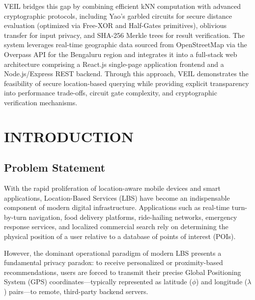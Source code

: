 \documentclass[12pt,a4paper,oneside]{report}
\begin{document}
VEIL bridges this gap by combining efficient kNN computation with advanced cryptographic protocols, including Yao's garbled circuits for secure distance evaluation (optimized via Free-XOR and Half-Gates primitives), oblivious transfer for input privacy, and SHA-256 Merkle trees for result verification. The system leverages real-time geographic data sourced from OpenStreetMap via the Overpass API for the Bengaluru region and integrates it into a full-stack web architecture comprising a React.js single-page application frontend and a Node.js/Express REST backend. Through this approach, VEIL demonstrates the feasibility of secure location-based querying while providing explicit transparency into performance trade-offs, circuit gate complexity, and cryptographic verification mechanisms.

\newpage
\tableofcontents
\newpage
\listoffigures
\newpage
\listoftables

\newpage
{}

\chapter{INTRODUCTION}

\section{Problem Statement}
With the rapid proliferation of location-aware mobile devices and smart applications, Location-Based Services (LBS) have become an indispensable component of modern digital infrastructure. Applications such as real-time turn-by-turn navigation, food delivery platforms, ride-hailing networks, emergency response services, and localized commercial search rely on determining the physical position of a user relative to a database of points of interest (POIs).

However, the dominant operational paradigm of modern LBS presents a fundamental privacy paradox: to receive personalized or proximity-based recommendations, users are forced to transmit their precise Global Positioning System (GPS) coordinates—typically represented as latitude ($\phi$) and longitude ($\lambda$) pairs—to remote, third-party backend servers.
\end{document}

